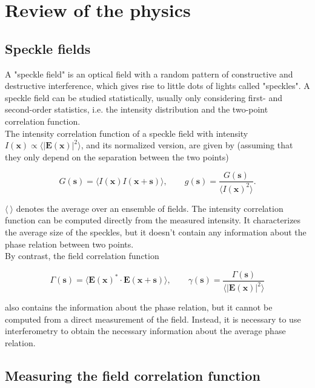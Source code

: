 \section{Review of the physics}

\subsection{Speckle fields} \label{speckles}

A "speckle field" is an optical field with a random pattern of constructive and destructive interference, which gives rise to little dots of lights called "speckles". 
A speckle field can be studied statistically, usually only considering first- and second-order statistics, i.e. the intensity distribution and the two-point 
correlation function. \\

The intensity correlation function of a speckle field with intensity $I(\bm x) \propto \langle |\bm E(\bm x)|^2 \rangle$, and its 
normalized version, are given by (assuming that they only depend on the separation between the two points)

\begin{equation}
    G(\bm s) = \langle I(\bm x)I(\bm x + \bm s) \rangle, \qquad g(\bm s) = \frac{G(\bm s)}{\langle I(\bm x)^2 \rangle}.
\end{equation}

$\langle \ \rangle$ denotes the average over an ensemble of fields. The intensity correlation function can be computed directly from the measured intensity. 
It characterizes the average size of the speckles, but it doesn't contain any information about the phase relation between two points. \\

By contrast, the field correlation function

\begin{equation}
    \Gamma(\bm s) = \langle \bm E(\bm x)^* \cdot \bm E(\bm x + \bm s)\rangle, \qquad \gamma(\bm s) = \frac{\Gamma(\bm s)}{\langle |\bm E(\bm x)|^2 \rangle}
\end{equation}

also contains the information about the phase relation, but it cannot be computed from a direct measurement of the field. Instead, it is necessary to use 
interferometry to obtain the necessary information about the average phase relation. 

\subsection{Measuring the field correlation function} \label{meas_corr}

